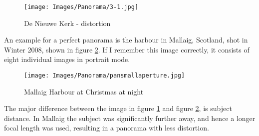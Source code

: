 \begin{figure}[htb]
	\centering
		\texttt{[image: Images/Panorama/3-1.jpg]}
	\caption{De Nieuwe Kerk - distortion}
	\label{fig:3-1}
\end{figure}

An example for a perfect \gls{panorama} is the harbour in Mallaig, Scotland, shot in Winter 2008, shown in figure \ref{fig:pansmallaperture}. If I remember this image correctly, it consists of eight individual images in portrait mode.

\begin{figure}[htb]
	\centering
		\texttt{[image: Images/Panorama/pansmallaperture.jpg]}
	\caption{Mallaig Harbour at Christmas at night}
	\label{fig:pansmallaperture}
\end{figure}

The major difference between the image in figure \ref{fig:3-1} and figure \ref{fig:pansmallaperture}, is subject distance. In Mallaig the subject was significantly further away, and hence a longer focal length was used, resulting in a \gls{panorama} with less distortion.
